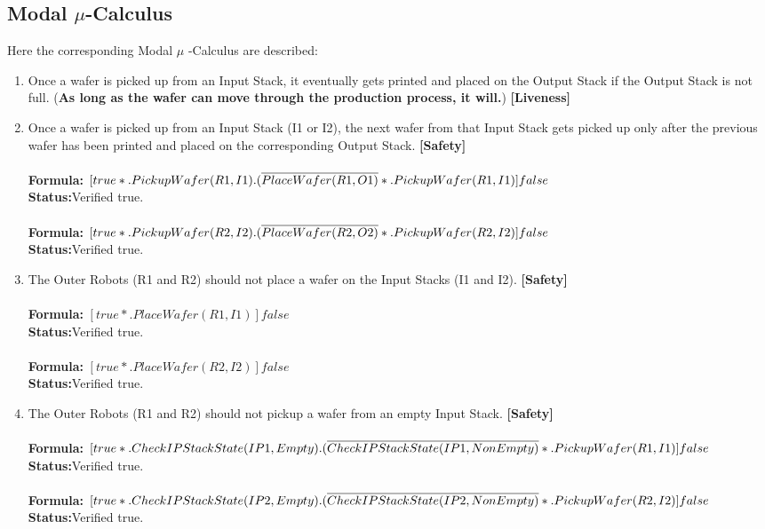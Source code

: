 \documentclass[a4paper,12pt]{article}
\begin{document}
	\subsection{Modal $\mu$-Calculus}
	Here the corresponding Modal $\mu$ -Calculus are described:
	\begin{enumerate}
		\item Once a wafer is picked up from an Input Stack, it eventually gets printed and placed on the Output Stack if the Output Stack is not full. (\textbf{As long as the wafer can move through the production process, it will.}) \textbf{[Liveness]}
		\\
		
		\item Once a wafer is picked up from an Input Stack (I1 or I2), the next wafer from that Input Stack gets picked up only after the previous wafer has been printed and placed on the corresponding Output Stack. \textbf{[Safety]}
		\\
		\\\textbf{Formula:} $[true*.PickupWafer(R1, I1) \\.(\overline{PlaceWafer(R1,O1)}*.PickupWafer(R1,I1)]false$ \\\textbf{Status:}Verified true.
		\\
		\\\textbf{Formula:} $[true*.PickupWafer(R2, I2)
		\\.(\overline{PlaceWafer(R2,O2)}*.PickupWafer(R2,I2)]false$ \\\textbf{Status:}Verified true.
		
		\item The Outer Robots (R1 and R2) should not place a wafer on the Input Stacks (I1 and I2). \textbf{[Safety]}
		\\
		\\\textbf{Formula:} $[true*. PlaceWafer(R1,I1)]false $ \\\textbf{Status:}Verified true.
		\\
		\\\textbf{Formula:} $[true*. PlaceWafer(R2,I2)]false $ \\\textbf{Status:}Verified true.
		
		
		\item The Outer Robots (R1 and R2) should not pickup a wafer from an empty Input Stack. \textbf{[Safety]}
		\\
		\\\textbf{Formula:} $[true*.  CheckIPStackState(IP1, Empty).
		\\(\overline{CheckIPStackState(IP1, NonEmpty)}*.PickupWafer(R1, I1)]false$ \\\textbf{Status:}Verified true.
		\\
		\\\textbf{Formula:} $[true*.  CheckIPStackState(IP2, Empty).
		\\(\overline{CheckIPStackState(IP2, NonEmpty)}*.PickupWafer(R2, I2)]false$ \\\textbf{Status:}Verified true.
		

\end{enumerate}
\end{document}
